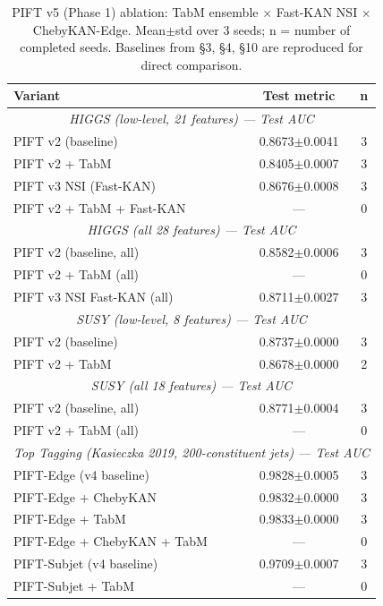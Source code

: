 \begin{table}[t]
\centering
\caption{PIFT v5 (Phase 1) ablation: TabM ensemble × Fast-KAN NSI × ChebyKAN-Edge.  Mean$\pm$std over 3 seeds; n = number of completed seeds.  Baselines from §3, §4, §10 are reproduced for direct comparison.}
\label{tab:pift_v5}
\footnotesize
\begin{tabular}{l c c}
\toprule
Variant & Test metric & n \\
\midrule
\multicolumn{3}{c}{\emph{HIGGS (low-level, 21 features) — Test AUC}} \\
\midrule
PIFT v2 (baseline) & 0.8673{\tiny$\pm$0.0041} & 3 \\
PIFT v2 + TabM & 0.8405{\tiny$\pm$0.0007} & 3 \\
PIFT v3 NSI (Fast-KAN) & 0.8676{\tiny$\pm$0.0008} & 3 \\
PIFT v2 + TabM + Fast-KAN & — & 0 \\
\midrule
\multicolumn{3}{c}{\emph{HIGGS (all 28 features) — Test AUC}} \\
\midrule
PIFT v2 (baseline, all) & 0.8582{\tiny$\pm$0.0006} & 3 \\
PIFT v2 + TabM (all) & — & 0 \\
PIFT v3 NSI Fast-KAN (all) & 0.8711{\tiny$\pm$0.0027} & 3 \\
\midrule
\multicolumn{3}{c}{\emph{SUSY (low-level, 8 features) — Test AUC}} \\
\midrule
PIFT v2 (baseline) & 0.8737{\tiny$\pm$0.0000} & 3 \\
PIFT v2 + TabM & 0.8678{\tiny$\pm$0.0000} & 2 \\
\midrule
\multicolumn{3}{c}{\emph{SUSY (all 18 features) — Test AUC}} \\
\midrule
PIFT v2 (baseline, all) & 0.8771{\tiny$\pm$0.0004} & 3 \\
PIFT v2 + TabM (all) & — & 0 \\
\midrule
\multicolumn{3}{c}{\emph{Top Tagging (Kasieczka 2019, 200-constituent jets) — Test AUC}} \\
\midrule
PIFT-Edge (v4 baseline) & 0.9828{\tiny$\pm$0.0005} & 3 \\
PIFT-Edge + ChebyKAN & 0.9832{\tiny$\pm$0.0000} & 3 \\
PIFT-Edge + TabM & 0.9833{\tiny$\pm$0.0000} & 3 \\
PIFT-Edge + ChebyKAN + TabM & — & 0 \\
PIFT-Subjet (v4 baseline) & 0.9709{\tiny$\pm$0.0007} & 3 \\
PIFT-Subjet + TabM & — & 0 \\

\end{tabular}
\end{table}
